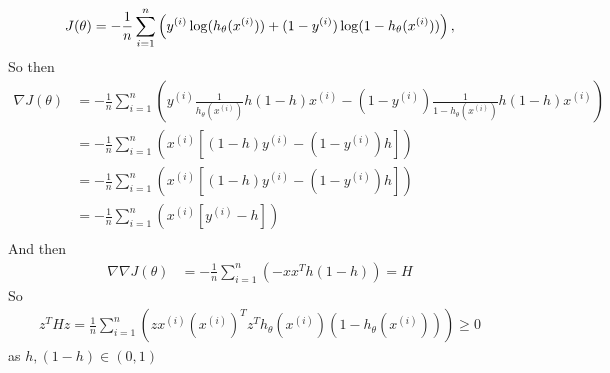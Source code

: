 
\begin{answer}
	\begin{equation*}
	J(\theta)
	= -\frac{1}{{n}} \sum_{i=1}^{n} \left(y^{(i)}\log(h_{\theta}(x^{(i)}))
	+  (1 - y^{(i)})\log(1 - h_{\theta}(x^{(i)}))\right),
	\end{equation*}
	So then
	\begin{align*}
	\nabla J(\theta)
	&= -\frac{1}{n} \sum_{i=1}^n \left(y^{(i)}\frac{1}{h_{\theta}(x^{(i)})} h(1-h) x^{(i)}
	-  (1 - y^{(i)})\frac{1}{1 - h_{\theta}(x^{(i)})} h(1-h) x^{(i)}\right) \\	
	&= -\frac{1}{n} \sum_{i=1}^n \left(x^{(i)} \left[ (1-h) y^{(i)} - (1 - y^{(i)} ) h \right]\right)\\
	&= -\frac{1}{n} \sum_{i=1}^n \left(x^{(i)} \left[ (1-h) y^{(i)} - (1 - y^{(i)} ) h \right]\right)\\
	&= -\frac{1}{n} \sum_{i=1}^n \left(x^{(i)} \left[ y^{(i)} - h \right]\right)\\
	\end{align*}
	And then
	\begin{align*}
	\nabla \nabla J(\theta)
	&= -\frac{1}{n} \sum_{i=1}^n \left( -xx^T h (1-h) \right) = H
	\end{align*}
	So
	\begin{align*}
	z^T H z = \frac{1}{n} \sum_{i=1}^n \left(z x^{(i)} (x^{(i)})^T z^T h_\theta(x^{(i)}) (1 - h_\theta(x^{(i)})) \right) \geq 0
	\end{align*}
	as $h, (1-h) \in (0, 1)$
\end{answer}
